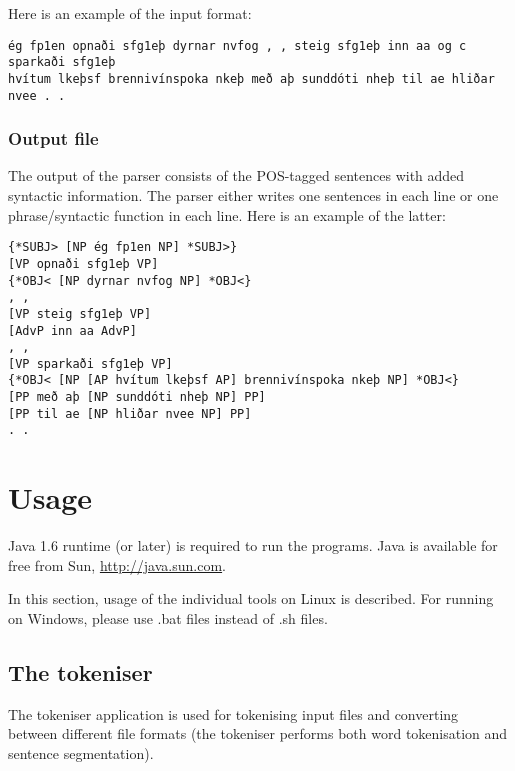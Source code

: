 \documentclass[11pt]{article}
\begin{document}
Here is an example of the input format:
\begin{verbatim}
ég fp1en opnaði sfg1eþ dyrnar nvfog , , steig sfg1eþ inn aa og c sparkaði sfg1eþ
hvítum lkeþsf brennivínspoka nkeþ með aþ sunddóti nheþ til ae hliðar nvee . .
\end{verbatim}

\subsubsection{Output file}
The output of the parser consists of the POS-tagged sentences with added syntactic information.
The parser either writes one sentences in each line or one phrase/syntactic function in each line.
Here is an example of the latter:

\begin{verbatim}
{*SUBJ> [NP ég fp1en NP] *SUBJ>}
[VP opnaði sfg1eþ VP]
{*OBJ< [NP dyrnar nvfog NP] *OBJ<}
, ,
[VP steig sfg1eþ VP]
[AdvP inn aa AdvP]
, ,
[VP sparkaði sfg1eþ VP]
{*OBJ< [NP [AP hvítum lkeþsf AP] brennivínspoka nkeþ NP] *OBJ<}
[PP með aþ [NP sunddóti nheþ NP] PP]
[PP til ae [NP hliðar nvee NP] PP]
. .
\end{verbatim}

\section{Usage}
\label{sec:usage}
Java 1.6 runtime (or later) is required to run the programs.
Java is available for free from Sun, \url{http://java.sun.com}.

In this section, usage of the individual tools on Linux is described. For running on Windows, please use .bat files instead of .sh files.
\subsection{The tokeniser}
\label{sec:tok}
The tokeniser application is used for tokenising input files and converting between different file formats (the tokeniser performs both word tokenisation and sentence segmentation).
\end{document}
